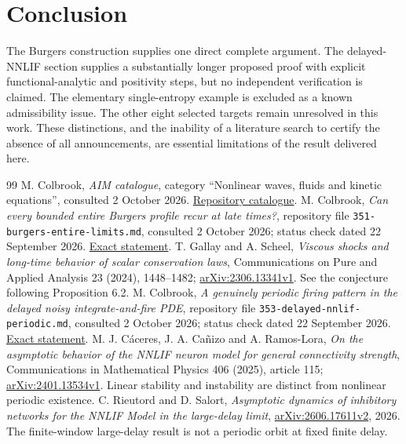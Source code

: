\documentclass[11pt,a4paper]{article}
\numberwithin{equation}{section}
\theoremstyle{remark}\newtheorem{remark}[theorem]{Remark}
\begin{document}
\section*{Conclusion}
The Burgers construction supplies one direct complete argument. The delayed-NNLIF section supplies a substantially longer proposed proof with explicit functional-analytic and positivity steps, but no independent verification is claimed. The elementary single-entropy example is excluded as a known admissibility issue. The other eight selected targets remain unresolved in this work. These distinctions, and the inability of a literature search to certify the absence of all announcements, are essential limitations of the result delivered here.

\begin{thebibliography}{99}
 M. Colbrook, \emph{AIM catalogue}, category ``Nonlinear waves, fluids and kinetic equations'', consulted 2 October 2026. \href{https://github.com/MColbrook/AIM/blob/main/CATALOG.md}{Repository catalogue}.
 M. Colbrook, \emph{Can every bounded entire Burgers profile recur at late times?}, repository file \texttt{351-burgers-entire-limits.md}, consulted 2 October 2026; status check dated 22 September 2026. \href{https://raw.githubusercontent.com/MColbrook/AIM/main/problems/351-burgers-entire-limits.md}{Exact statement}.
 T. Gallay and A. Scheel, \emph{Viscous shocks and long-time behavior of scalar conservation laws}, Communications on Pure and Applied Analysis 23 (2024), 1448--1482; \href{https://arxiv.org/html/2306.13341v1}{arXiv:2306.13341v1}. See the conjecture following Proposition 6.2.
 M. Colbrook, \emph{A genuinely periodic firing pattern in the delayed noisy integrate-and-fire PDE}, repository file \texttt{353-delayed-nnlif-periodic.md}, consulted 2 October 2026; status check dated 22 September 2026. \href{https://raw.githubusercontent.com/MColbrook/AIM/main/problems/353-delayed-nnlif-periodic.md}{Exact statement}.
 M. J. C\'aceres, J. A. Ca\~nizo and A. Ramos-Lora, \emph{On the asymptotic behavior of the NNLIF neuron model for general connectivity strength}, Communications in Mathematical Physics 406 (2025), article 115; \href{https://arxiv.org/html/2401.13534v1}{arXiv:2401.13534v1}. Linear stability and instability are distinct from nonlinear periodic existence.
 C. Rieutord and D. Salort, \emph{Asymptotic dynamics of inhibitory networks for the NNLIF Model in the large-delay limit}, \href{https://arxiv.org/html/2606.17611v2}{arXiv:2606.17611v2}, 2026. The finite-window large-delay result is not a periodic orbit at fixed finite delay.

\end{thebibliography}
\end{document}
